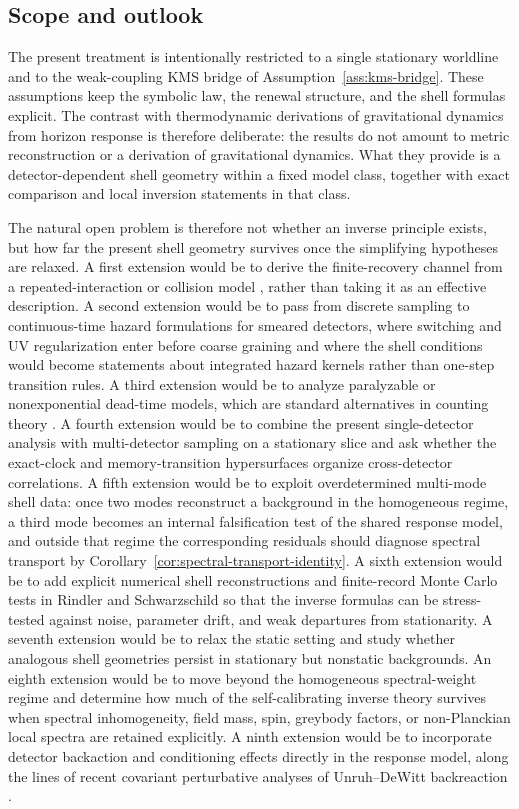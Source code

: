 \subsection{Scope and outlook}

The present treatment is intentionally restricted to a single stationary worldline and to the weak-coupling KMS bridge of Assumption~\ref{ass:kms-bridge}. These assumptions keep the symbolic law, the renewal structure, and the shell formulas explicit. The contrast with thermodynamic derivations of gravitational dynamics from horizon response \cite{Jacobson1995} is therefore deliberate: the results do not amount to metric reconstruction or a derivation of gravitational dynamics. What they provide is a detector-dependent shell geometry within a fixed model class, together with exact comparison and local inversion statements in that class.

The natural open problem is therefore not whether an inverse principle exists, but how far the present shell geometry survives once the simplifying hypotheses are relaxed. A first extension would be to derive the finite-recovery channel from a repeated-interaction or collision model \cite{BreuerPetruccione2002}, rather than taking it as an effective description. A second extension would be to pass from discrete sampling to continuous-time hazard formulations for smeared detectors, where switching and UV regularization enter before coarse graining and where the shell conditions would become statements about integrated hazard kernels rather than one-step transition rules. A third extension would be to analyze paralyzable or nonexponential dead-time models, which are standard alternatives in counting theory \cite{Muller1973,CantorTeich1975}. A fourth extension would be to combine the present single-detector analysis with multi-detector sampling on a stationary slice and ask whether the exact-clock and memory-transition hypersurfaces organize cross-detector correlations. A fifth extension would be to exploit overdetermined multi-mode shell data: once two modes reconstruct a background in the homogeneous regime, a third mode becomes an internal falsification test of the shared response model, and outside that regime the corresponding residuals should diagnose spectral transport by Corollary~\ref{cor:spectral-transport-identity}. A sixth extension would be to add explicit numerical shell reconstructions and finite-record Monte Carlo tests in Rindler and Schwarzschild so that the inverse formulas can be stress-tested against noise, parameter drift, and weak departures from stationarity. A seventh extension would be to relax the static setting and study whether analogous shell geometries persist in stationary but nonstatic backgrounds. An eighth extension would be to move beyond the homogeneous spectral-weight regime and determine how much of the self-calibrating inverse theory survives when spectral inhomogeneity, field mass, spin, greybody factors, or non-Planckian local spectra are retained explicitly. A ninth extension would be to incorporate detector backaction and conditioning effects directly in the response model, along the lines of recent covariant perturbative analyses of Unruh--DeWitt backreaction \cite{WilkinsonEtAl2025Backaction}.

